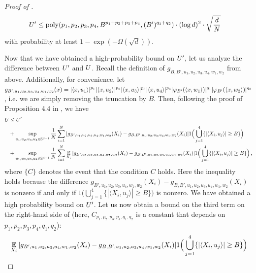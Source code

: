\begin{proof}[Proof of ]
\begin{align}
{U'}
& \leq \textup{poly}(p_1, p_2, p_3, p_4, B^{p_1 + p_2 + p_3 + p_4}, (B')^{q_1 + q_2}) \cdot (\log d)^2 \cdot \sqrt{\frac{d}{N}}
\end{align}
with probability at least $1 - \exp(-\Omega(\sqrt{d}))$.

Now that we have obtained a high-probability bound on ${U'}$, let us analyze the difference between ${U'}$ and $U$. Recall the definition of $g_{B, B', u_1, u_2, u_3, u_4, w_1, w_2}$ from above. Additionally, for convenience, let $g_{B', u_1, u_2, u_3, u_4, w_1, w_2}(x) = |\langle x, u_1 \rangle|^{p_1} |\langle x, u_2 \rangle|^{p_2} |\langle x, u_3 \rangle|^{p_3} |\langle x, u_4 \rangle|^{p_4} |{\varphi_{B'}}(\langle x, w_1 \rangle)|^{q_1} |{\varphi_{B'}}(\langle x, w_2 \rangle)|^{q_2}$, i.e. we are simply removing the truncation by $B$. Then, following the proof of Proposition 4.4 in \citet{ALPT2009_concentration}, we have
\begin{align} \label{eq:concentration_decomposition}
U
& \leq {U'} \\
& + \sup_{u_1, u_2, u_3, u_4 \in \mathbb{S}^{d - 1}} \frac{1}{N} \sum_{i = 1}^N |g_{B', u_1, u_2, u_3, u_4, w_1, w_2}(X_i) - g_{B, B', u_1, u_2, u_3, u_4, w_1, w_2}(X_i)|1\Big(\bigcup_{j = 1}^4 \{|\langle X_i, u_j \rangle| \geq B\}\Big) \\
&  + \sup_{u_1, u_2, u_3, u_4 \in \mathbb{S}^{d - 1}} \frac{1}{N} \sum_{i = 1}^N \operatorname*{\mathbb{E}}_{X_i} |g_{B', u_1, u_2, u_3, u_4, w_1, w_2}(X_i) - g_{B, B', u_1, u_2, u_3, u_4, w_1, w_2}(X_i)|1\Big(\bigcup_{j = 1}^4 \{|\langle X_i, u_j \rangle| \geq B\}\Big) \,,
\end{align}
where $\{C\}$ denotes the event that the condition $C$ holds. Here the inequality holds because the difference $g_{B', u_1, u_2, u_3, u_4, w_1, w_2}(X_i) - g_{B, B', u_1, u_2, u_3, u_4, w_1, w_2}(X_i)$ is nonzero if and only if $1\Big(\bigcup_{j = 1}^4 \{|\langle X_i, u_j \rangle| \geq B\}\Big)$ is nonzero. We have obtained a high probability bound on ${U'}$. Let us now obtain a bound on the third term on the right-hand side of  (here, $C_{p_1, p_2, p_3, p_4, q_1, q_2}$ is a constant that depends on $p_1, p_2, p_3, p_4, q_1, q_2$):
\begin{align}
& \E_{\srvL_i} |g_{B', u_1, u_2, u_3, u_4, w_1, w_2}(X_i) - g_{B, B', u_1, u_2, u_3, u_4, w_1, w_2}(X_i)| 1\Big(\bigcup_{j = 1}^4 \{|\langle X_i, u_j \rangle| \geq B\} \Big) \\

\end{align}
\end{proof}
